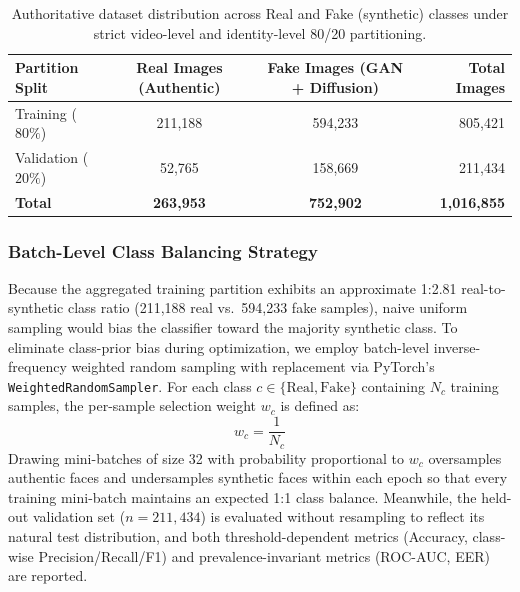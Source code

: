 \documentclass[fleqn,10pt]{wlscirep}
\begin{document}
\begin{table}[htbp]
\centering
\begin{tabular}{|l|c|c|r|}
\hline
\textbf{Partition Split} & \textbf{Real Images (Authentic)} & \textbf{Fake Images (GAN + Diffusion)} & \textbf{Total Images} \\ \hline
Training ($80\%$)   & 211,188 & 594,233 & 805,421 \\
Validation ($20\%$) & 52,765  & 158,669 & 211,434 \\ \hline
\textbf{Total}      & \textbf{263,953} & \textbf{752,902} & \textbf{1,016,855} \\ \hline
\end{tabular}
\caption{\label{tab:dataset_splits}Authoritative dataset distribution across Real and Fake (synthetic) classes under strict video-level and identity-level 80/20 partitioning.}
\end{table}

\subsubsection*{Batch-Level Class Balancing Strategy}
Because the aggregated training partition exhibits an approximate 1:2.81 real-to-synthetic class ratio (211,188 real vs.\ 594,233 fake samples), naive uniform sampling would bias the classifier toward the majority synthetic class. To eliminate class-prior bias during optimization, we employ batch-level inverse-frequency weighted random sampling with replacement via PyTorch's \texttt{WeightedRandomSampler}. For each class $c \in \{\text{Real}, \text{Fake}\}$ containing $N_c$ training samples, the per-sample selection weight $w_c$ is defined as:
\begin{equation}
w_c = \frac{1}{N_c}
\end{equation}
Drawing mini-batches of size 32 with probability proportional to $w_c$ oversamples authentic faces and undersamples synthetic faces within each epoch so that every training mini-batch maintains an expected 1:1 class balance. Meanwhile, the held-out validation set ($n=211{,}434$) is evaluated without resampling to reflect its natural test distribution, and both threshold-dependent metrics (Accuracy, class-wise Precision/Recall/F1) and prevalence-invariant metrics (ROC-AUC, EER) are reported.
\end{document}
